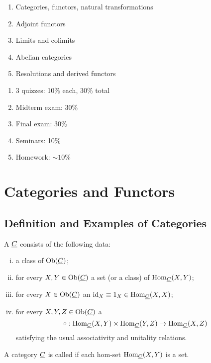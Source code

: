 
\begin{enumerate}
	\item Categories, functors, natural transformations
	\item Adjoint functors
	\item Limits and colimits
	\item Abelian categories
	\item Resolutions and derived functors
\end{enumerate}

\begin{enumerate}
	\item 3 quizzes: 10\% each, 30\% total
	\item Midterm exam: 30\%
	\item Final exam: 30\%
	\item Seminars: 10\%
	\item Homework: \( {\sim}10\% \)
\end{enumerate}

\chapter{Categories and Functors}

\section{Definition and Examples of Categories}

\begin{definition*}
	A  \( \underline{C} \) consists of the following data:
	\begin{enumerate}[(i)]
		\item a class of  \( \operatorname{Ob}(\underline{C}) \);
		\item for every \( X, Y \in \operatorname{Ob}(\underline{C}) \) a set (or a class) of  \( \operatorname{Hom}_{\underline{C}}(X, Y) \);
		\item for every \( X \in \operatorname{Ob}(\underline{C}) \) an  \( \mathrm{id}_X \equiv 1_X \in \operatorname{Hom}_{\underline{C}}(X, X) \);
		\item for every \( X, Y, Z \in \operatorname{Ob}(\underline{C}) \) a 
			\[
				\circ: \operatorname{Hom}_{\underline{C}}(X, Y) \times \operatorname{Hom}_{\underline{C}}(Y, Z) \to \operatorname{Hom}_{\underline{C}}(X, Z)
			\]
			satisfying the usual associativity and unitality relations.
	\end{enumerate}
	A category \( \underline{C} \) is called  if each hom-set \( \operatorname{Hom}_{\underline{C}}(X, Y) \) is a set.
\end{definition*}

